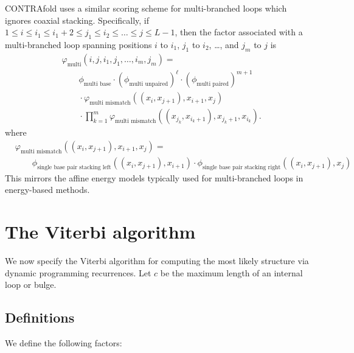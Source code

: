 \documentclass{article}
\newcommand{\multimismatch}{\varphi_\text{multi mismatch}}
\newcommand{\sbpstackingleft}{\phi_\text{single base pair stacking left}}
\newcommand{\sbpstackingright}{\phi_\text{single base pair stacking right}}
\newcommand{\multi}{\varphi_\text{multi}}
\newcommand{\multibase}{\phi_\text{multi base}}
\newcommand{\multiunpaired}{\phi_\text{multi unpaired}}
\newcommand{\multipaired}{\phi_\text{multi paired}}
\begin{document}
  CONTRAfold uses a similar scoring scheme for multi-branched loops which ignores coaxial
  stacking.  Specifically, if $1 \le i \le i_1 \le i_1 + 2 \le j_1 \le i_2 \le \ldots \le j \le L-1$, 
  then the factor associated with a multi-branched loop spanning
  positions $i$ to $i_1$, $j_1$ to $i_2$, \ldots, and $j_m$ to $j$ is
  \begin{align}
    &\multi(i,j,i_1,j_1,\ldots,i_m,j_m) = {} \nonumber \\
    &\qquad\multibase \cdot \left(\multiunpaired\right)^\ell \cdot \left(\multipaired\right)^{m+1} \nonumber \\
    &\qquad{} \cdot \multimismatch((x_i,x_{j+1}),x_{i+1},x_j) \nonumber \\
    &\qquad{} \cdot \prod_{k=1}^m \multimismatch((x_{j_k},x_{i_k+1}),x_{j_k+1},x_{i_k}).
  \end{align}
  where
  \begin{align}
    &\multimismatch((x_i,x_{j+1}),x_{i+1},x_j) = {} \nonumber \\
    &\qquad\sbpstackingleft((x_i,x_{j+1}),x_{i+1}) \cdot \sbpstackingright((x_i,x_{j+1}),x_j) 
  \end{align}
  This mirrors the affine energy models typically used for multi-branched loops
  in energy-based methods.
  
  \newpage
  \section{The Viterbi algorithm}

  We now specify the Viterbi algorithm for computing the most likely structure via 
  dynamic programming recurrences. Let $c$ be the maximum length of an internal loop or
  bulge.  

  \subsection{Definitions}
  
  We define the following factors:
\end{document}
